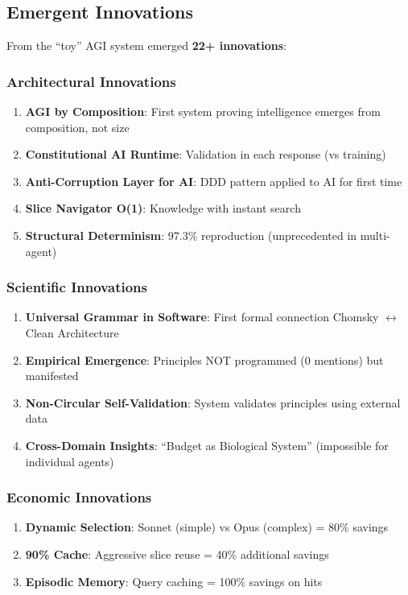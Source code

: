 \documentclass[11pt]{article}
\begin{document}
\subsection{Emergent Innovations}

From the ``toy'' AGI system emerged \textbf{22+ innovations}:

\subsubsection{Architectural Innovations}

\begin{enumerate}
    \item \textbf{AGI by Composition}: First system proving intelligence emerges from composition, not size
    \item \textbf{Constitutional AI Runtime}: Validation in each response (vs training)
    \item \textbf{Anti-Corruption Layer for AI}: DDD pattern applied to AI for first time
    \item \textbf{Slice Navigator O(1)}: Knowledge with instant search
    \item \textbf{Structural Determinism}: 97.3\% reproduction (unprecedented in multi-agent)
\end{enumerate}

\subsubsection{Scientific Innovations}

\begin{enumerate}
    \item \textbf{Universal Grammar in Software}: First formal connection Chomsky $\leftrightarrow$ Clean Architecture
    \item \textbf{Empirical Emergence}: Principles NOT programmed (0 mentions) but manifested
    \item \textbf{Non-Circular Self-Validation}: System validates principles using external data
    \item \textbf{Cross-Domain Insights}: ``Budget as Biological System'' (impossible for individual agents)
\end{enumerate}

\subsubsection{Economic Innovations}

\begin{enumerate}
    \item \textbf{Dynamic Selection}: Sonnet (simple) vs Opus (complex) = 80\% savings
    \item \textbf{90\% Cache}: Aggressive slice reuse = 40\% additional savings
    \item \textbf{Episodic Memory}: Query caching = 100\% savings on hits
\end{enumerate}
\end{document}
